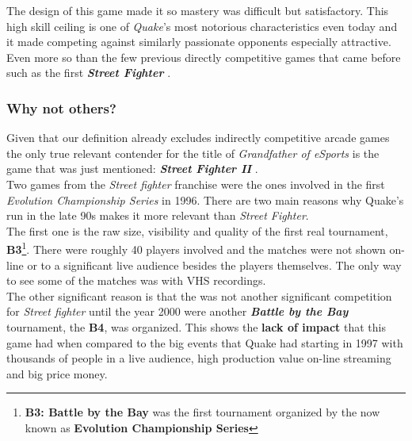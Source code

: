 The design of this game made it so mastery was difficult but satisfactory. This high skill ceiling is one of \textit{Quake}'s most notorious characteristics even today and it made competing against similarly passionate opponents especially attractive. Even more so than the few previous directly competitive games that came before such as the first \textit{\textbf{Street Fighter}} \citep{game:streetfighter2}.\\

\subsubsection{Why not others?}

Given that our definition already excludes indirectly competitive arcade games the only true relevant contender for the title of \textit{Grandfather of eSports} is the game that was just mentioned: \textbf{\textit{Street Fighter II}} \citep{game:streetfighter2}.\\

Two games from the \textit{Street fighter} franchise were the ones involved in the first \textit{Evolution Championship Series} in 1996. There are two main reasons why Quake's run in the late 90s makes it more relevant than \textit{Street Fighter}.\\

The first one is the raw size, visibility and quality of the first real tournament, \textbf{B3}\footnote{\textbf{B3: Battle by the Bay}\citep{evo} was the first tournament organized by the now known as \textbf{Evolution Championship Series}}. There were roughly 40 players involved and the matches were not shown on-line or to a significant live audience besides the players themselves. The only way to see some of the matches was with VHS recordings.\\

The other significant reason is that the was not another significant competition for \textit{Street fighter} until the year 2000 were another \textit{\textbf{Battle by the Bay}} tournament, the \textbf{B4}, was organized. This shows the \textbf{lack of impact} that this game had when compared to the big events that Quake had starting in 1997 with thousands of people in a live audience, high production value on-line streaming and big price money.





